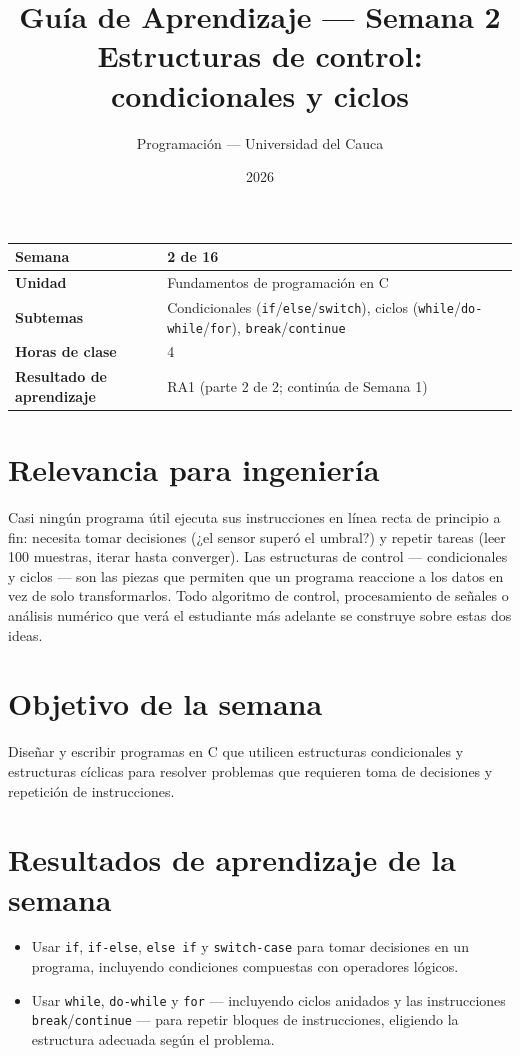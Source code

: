 \documentclass[11pt,letterpaper]{article}
\title{\textcolor{unicaucaverde}{\Large Guía de Aprendizaje --- Semana 2}\\[4pt]
  \large Estructuras de control: condicionales y ciclos}
\author{Programación --- Universidad del Cauca}
\date{2026}
\begin{document}
\maketitle

\begin{center}
\begin{tabular}{|>{\bfseries}p{4cm}|p{10cm}|}
\hline
Semana & 2 de 16 \\ \hline
Unidad & Fundamentos de programación en C \\ \hline
Subtemas & Condicionales (\texttt{if}/\texttt{else}/\texttt{switch}), ciclos
  (\texttt{while}/\texttt{do-while}/\texttt{for}), \texttt{break}/\texttt{continue} \\ \hline
Horas de clase & 4 \\ \hline
Resultado de aprendizaje & RA1 (parte 2 de 2; continúa de Semana 1) \\ \hline
\end{tabular}
\end{center}

\section*{Relevancia para ingeniería}

Casi ningún programa útil ejecuta sus instrucciones en línea recta de principio a fin: necesita
tomar decisiones (¿el sensor superó el umbral?) y repetir tareas (leer 100 muestras, iterar hasta
converger). Las estructuras de control --- condicionales y ciclos --- son las piezas que permiten
que un programa reaccione a los datos en vez de solo transformarlos. Todo algoritmo de control,
procesamiento de señales o análisis numérico que verá el estudiante más adelante se construye sobre
estas dos ideas.

\section{Objetivo de la semana}

Diseñar y escribir programas en C que utilicen estructuras condicionales y estructuras cíclicas
para resolver problemas que requieren toma de decisiones y repetición de instrucciones.

\section{Resultados de aprendizaje de la semana}

\begin{itemize}[leftmargin=1.2cm]
  \item[\textbf{RA2.1.}] Usar \texttt{if}, \texttt{if-else}, \texttt{else if} y \texttt{switch-case}
        para tomar decisiones en un programa, incluyendo condiciones compuestas con operadores
        lógicos.
  \item[\textbf{RA2.2.}] Usar \texttt{while}, \texttt{do-while} y \texttt{for} --- incluyendo
        ciclos anidados y las instrucciones \texttt{break}/\texttt{continue} --- para repetir
        bloques de instrucciones, eligiendo la estructura adecuada según el problema.
\end{itemize}
\end{document}
